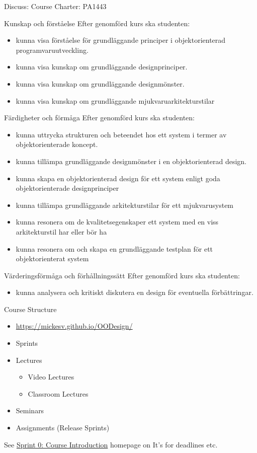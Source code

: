 \documentclass[10pt,t,a4paper]{beamer}
\begin{document}
\begin{frame}[shrink=15,label=sec-4]{Discuss: Course Charter: PA1443}

\alert{Kunskap och förståelse} Efter genomförd kurs ska studenten:
\begin{itemize}
\item kunna visa förståelse för grundläggande principer i objektorienterad programvaruutveckling.
\item kunna visa kunskap om grundläggande designprinciper.
\item kunna visa kunskap om grundläggande designmönster.
\item kunna visa kunskap om grundläggande mjukvaruarkitekturstilar
\end{itemize}

\alert{Färdigheter och förmåga} Efter genomförd kurs ska studenten:
\begin{itemize}
\item kunna uttrycka strukturen och beteendet hos ett system i termer av objektorienterade koncept.
\item kunna tillämpa grundläggande designmönster i en objektorienterad design.
\item kunna skapa en objektorienterad design för ett system enligt goda objektorienterade designprinciper
\item kunna tillämpa grundläggande arkitekturstilar för ett mjukvarusystem
\item kunna resonera om de kvalitetsegenskaper ett system med en viss arkitekturstil har eller bör ha
\item kunna resonera om och skapa en grundläggande testplan för ett objektorienterat system
\end{itemize}

\alert{Värderingsförmåga och förhållningssätt} Efter genomförd kurs ska studenten:
\begin{itemize}
\item kunna analysera och kritiskt diskutera en design för eventuella förbättringar.
\end{itemize}
\end{frame}
\begin{frame}[label=sec-5]{Course Structure}
\begin{itemize}
\item \url{https://mickesv.github.io/OODesign/}

\item Sprints
\item Lectures
\begin{itemize}
\item Video Lectures
\item Classroom Lectures
\end{itemize}
\item Seminars
\item Assignments (Release Sprints)
\end{itemize}

See \href{https://mickesv.github.io/OODesign/Sprint0-course-intro.html}{Sprint 0: Course Introduction} homepage on It's for deadlines etc.        
\end{frame}
\end{document}
